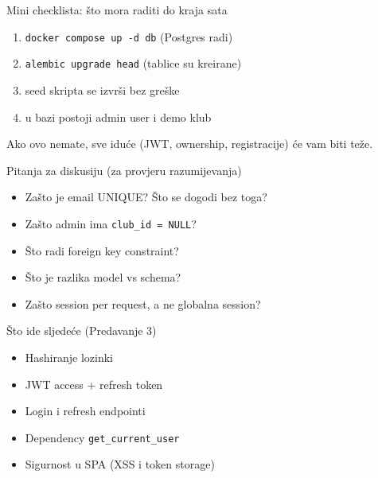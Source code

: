 	\begin{frame}{Mini checklista: što mora raditi do kraja sata}
		\begin{enumerate}
			\item \texttt{docker compose up -d db} (Postgres radi)
			\item \texttt{alembic upgrade head} (tablice su kreirane)
			\item seed skripta se izvrši bez greške
			\item u bazi postoji admin user i demo klub
		\end{enumerate}
		
		\vspace{0.6em}
		Ako ovo nemate, sve iduće (JWT, ownership, registracije) će vam biti teže.
	\end{frame}
	
	\begin{frame}{Pitanja za diskusiju (za provjeru razumijevanja)}
		\begin{itemize}
			\item Zašto je email UNIQUE? Što se dogodi bez toga?
			\item Zašto admin ima \texttt{club\_id = NULL}?
			\item Što radi foreign key constraint?
			\item Što je razlika model vs schema?
			\item Zašto session per request, a ne globalna session?
		\end{itemize}
	\end{frame}
	
	\begin{frame}{Što ide sljedeće (Predavanje 3)}
		\begin{itemize}
			\item Hashiranje lozinki
			\item JWT access + refresh token
			\item Login i refresh endpointi
			\item Dependency \texttt{get\_current\_user}
			\item Sigurnost u SPA (XSS i token storage)
		\end{itemize}
	\end{frame}
	

